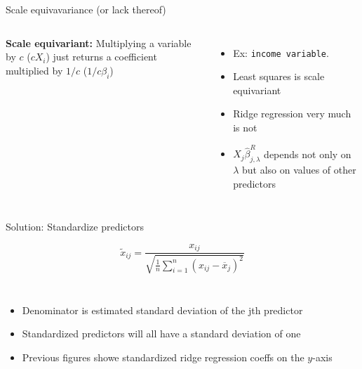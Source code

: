 \documentclass[aspectratio=169,usenames,dvipsnames]{beamer}
\newcommand{\InstructorList}[1]{
\begin{itemize}
	\color{orange}
	#1
\end{itemize}
}
\begin{document}
\begin{frame}[t]{Scale equivavariance (or lack thereof)}

\begin{columns}
\centering
\textbf{Scale equivariant:} Multiplying a variable by $c$ ($cX_i$) just returns a coefficient multiplied by $1/c$ ($1/c \beta_i$)

\centering
\InstructorList{
\item Ex: \texttt{income variable}.
\item Least squares is scale equivariant
\item Ridge regression very much is not
\item $X_j\hat \beta_{j,\lambda}^R$ depends not only on $\lambda$ but also on values of other predictors
}
\end{columns}

\end{frame}
\begin{frame}[t]{Solution: Standardize predictors}

\begin{equation*}
	\widetilde x_{ij} = \frac{x_{ij}}{
	\sqrt{ \tfrac{1}{n} \sum_{i=1}^n (x_{ij}-\overline x_j)^2}
	}
\end{equation*}
\begin{columns}
\centering
\InstructorList{
\item Denominator is estimated standard deviation of the jth predictor
\item Standardized predictors will all have a standard deviation of one
\item Previous figures showe standardized ridge regression coeffs on the $y$-axis
}
\centering

\end{columns}

\end{frame}
\end{document}
